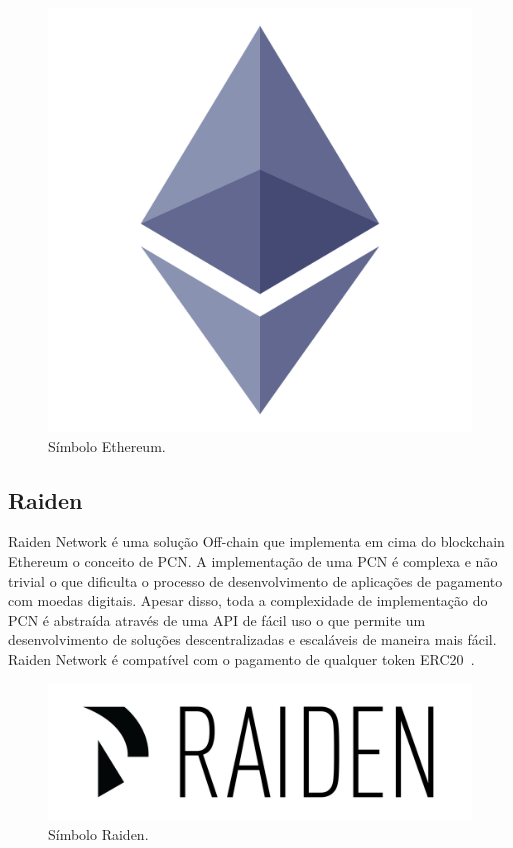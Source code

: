 \documentclass[12pt]{article}
\begin{document}
\begin{figure}[H]
    \centering
    \includegraphics[scale=0.1]{Imagens/ethereum.png}
    \caption{Símbolo Ethereum.}
    \label{fig:ethereum_simbol}
\end{figure}

\subsection{Raiden}
     
 Raiden Network é uma solução Off-chain que implementa em cima do blockchain Ethereum o conceito de PCN. A implementação de uma PCN é complexa e não trivial o que dificulta o processo de desenvolvimento de aplicações de pagamento com moedas digitais. Apesar disso, toda a complexidade de implementação do PCN é abstraída através de uma API de fácil uso o que permite um desenvolvimento de soluções descentralizadas e escaláveis de maneira mais fácil. Raiden Network é compatível com o pagamento de qualquer token ERC20~\cite{raidenmedium}.
     
\begin{figure}[H]
    \centering
    \includegraphics[scale=0.4]{Imagens/raiden.png}
    \caption{Símbolo Raiden.}
    \label{fig:raiden_simbol}
\end{figure}
\end{document}
